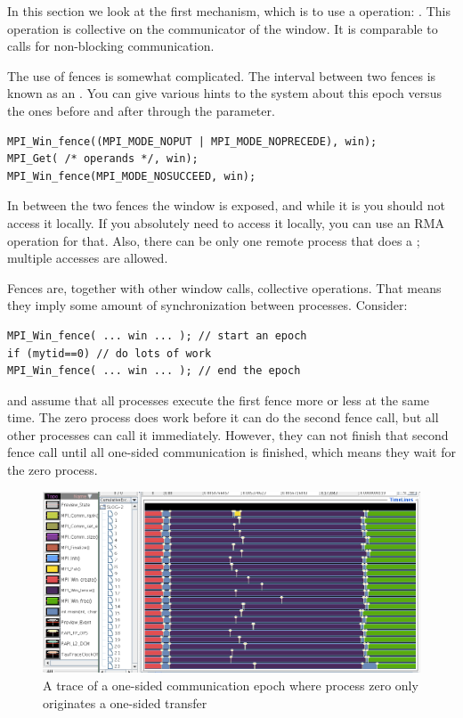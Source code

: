 In this section we look at the first mechanism,
which is to use a  operation: .
This operation is collective on the communicator of the window.
It is comparable to  calls for non-blocking communication.

The use of fences is somewhat complicated. The interval between two fences
is known as an .
You can give various hints to the system about this epoch versus the ones
before and after through the  parameter.
\begin{lstlisting}
MPI_Win_fence((MPI_MODE_NOPUT | MPI_MODE_NOPRECEDE), win);
MPI_Get( /* operands */, win);
MPI_Win_fence(MPI_MODE_NOSUCCEED, win);
\end{lstlisting}
In between the two fences the window is exposed, and while it is you
should not access it locally. If you absolutely need to access it
locally, you can use an \ac{RMA} operation for that. Also, there can be only one
remote process that does a ; multiple  accesses are allowed.

Fences are, together with other window calls, collective operations. That means they 
imply some amount of synchronization between processes. Consider:
\begin{lstlisting}
MPI_Win_fence( ... win ... ); // start an epoch
if (mytid==0) // do lots of work
MPI_Win_fence( ... win ... ); // end the epoch
\end{lstlisting}
and assume that all processes execute the first fence more or less at the same time.
The zero process does work before it can do the second fence call, but all other
processes can call it immediately. However, they can not finish that second fence call
until all one-sided communication is finished, which means they wait for the zero process.

\begin{figure}[ht]
  \includegraphics[scale=.4]{graphics/lonestar-twonode-put}%
  \caption{A trace of a one-sided communication epoch where process zero only originates
  a one-sided transfer}
  \label{fig:putblock}
\end{figure}

